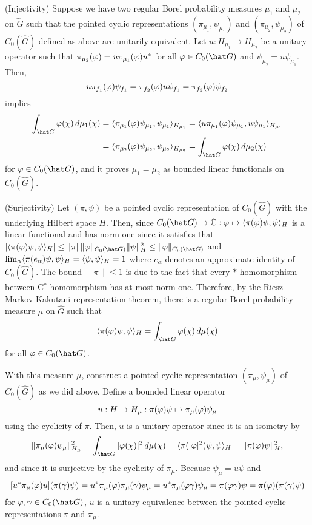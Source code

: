 \documentclass[a4paper]{article}
\begin{document}
\begin{pf}
(Injectivity)
Suppose we have two regular Borel probability measures $\mu_1$ and $\mu_2$ on $\hat G$ such that the pointed cyclic representations $(\pi_{\mu_1},\psi_{\mu_1})$ and $(\pi_{\mu_2},\psi_{\mu_2})$ of $C_0(\hat G)$ defined as above are unitarily equivalent.
Let $u:H_{\mu_1}\to H_{\mu_2}$ be a unitary operator such that $\pi_{\mu_2}(\varphi)=u\pi_{\mu_1}(\varphi)u^*$ for all $\f\in C_0(\hat G)$ and $\psi_{\mu_2}=u\psi_{\mu_1}$.
Then,
\[u\pi_{f_1}(\varphi)\psi_{f_1}=\pi_{f_2}(\varphi)u\psi_{f_1}=\pi_{f_2}(\varphi)\psi_{f_2}\]
implies
\begin{align*}
\int_{\hat G}\f(\chi)\,d\mu_1(\chi)&=\<\pi_{\mu_1}(\f)\psi_{\mu_1},\psi_{\mu_1}\>_{H_{\mu_1}}=\<u\pi_{\mu_1}(\f)\psi_{\mu_1},u\psi_{\mu_1}\>_{H_{\mu_1}}\\
&=\<\pi_{\mu_2}(\f)\psi_{\mu_2},\psi_{\mu_2}\>_{H_{\mu_2}}=\int_{\hat G}\f(\chi)\,d\mu_2(\chi)
\end{align*}
for $\f\in C_0(\hat G)$, and it proves $\mu_1=\mu_2$ as bounded linear functionals on $C_0(\hat G)$.

(Surjectivity)
Let $(\pi,\psi)$ be a pointed cyclic representation of $C_0(\hat G)$ with the underlying Hilbert space $H$.
Then, since $C_0(\hat G)\to\C:\f\mapsto\<\pi(\f)\psi,\psi\>_H$ is a linear functional and has norm one since it satisfies that $|\<\pi(\f)\psi,\psi\>_H|\le\|\pi\|\|\f\|_{C_0(\hat G)}\|\psi\|_H^2\le\|\f\|_{C_0(\hat G)}$ and $\lim_\alpha\langle\pi(e_\alpha)\psi,\psi\rangle_H=\langle\psi,\psi\rangle_H=1$ where $e_\alpha$ denotes an approximate identity of $C_0(\hat G)$.
The bound $\|\pi\|\le1$ is due to the fact that every $*$-homomorphism between C$^*$-homomorphism has at most norm one.
Therefore, by the Riesz-Markov-Kakutani representation theorem, there is a regular Borel probability measure $\mu$ on $\hat G$ such that
\[\<\pi(\f)\psi,\psi\>_H=\int_{\hat G}\f(\chi)\,d\mu(\chi)\]
for all $\f\in C_0(\hat G)$.

With this measure $\mu$, construct a pointed cyclic representation $(\pi_\mu,\psi_\mu)$ of $C_0(\hat G)$ as we did above.
Define a bounded linear operator
\[u:H\to H_\mu:\pi(\varphi)\psi\mapsto\pi_\mu(\varphi)\psi_\mu\]
using the cyclicity of $\pi$.
Then, $u$ is a unitary operator since it is an isometry by
\[\|\pi_\mu(\f)\psi_\mu\|_{H_\mu}^2=\int_{\hat G}|\f(\chi)|^2\,d\mu(\chi)=\<\pi(|\f|^2)\psi,\psi\>_H=\|\pi(\f)\psi\|_H^2,\]
and since it is surjective by the cyclicity of $\pi_\mu$.
Because $\psi_\mu=u\psi$ and
\[[u^*\pi_\mu(\varphi)u](\pi(\gamma)\psi)=u^*\pi_\mu(\varphi)\pi_\mu(\gamma)\psi_\mu=u^*\pi_\mu(\varphi\gamma)\psi_\mu=\pi(\varphi\gamma)\psi=\pi(\varphi)(\pi(\gamma)\psi)\]
for $\f,\gamma\in C_0(\hat G)$, $u$ is a unitary equivalence between the pointed cyclic representations $\pi$ and $\pi_\mu$.
\end{pf}
\end{document}
